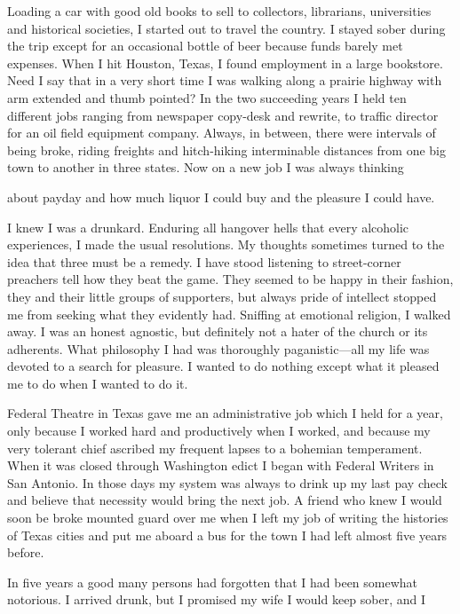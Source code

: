 \begin{biblechapter}
Loading a car with good old books to sell to collectors, librarians, universities and historical societies, I started out to travel the country. I stayed sober during the trip except for an occasional bottle of beer because funds barely met expenses. When I hit Houston, Texas, I found employment in a large bookstore. Need I say that in a very short time I was walking along a prairie highway with arm extended and thumb pointed? In the two succeeding years I held ten different jobs ranging from newspaper copy-desk and rewrite, to traffic director for an oil field equipment company. Always, in between, there were intervals of being broke, riding freights and hitch-hiking interminable distances from one big town to another in three states. Now on a new job I was always thinking

about payday and how much liquor I could buy and the pleasure I could have.

I knew I was a drunkard. Enduring all hangover hells that every alcoholic experiences, I made the usual resolutions. My thoughts sometimes turned to the idea that three must be a remedy. I have stood listening to street-corner preachers tell how they beat the game. They seemed to be happy in their fashion, they and their little groups of supporters, but always pride of intellect stopped me from seeking what they evidently had. Sniffing at emotional religion, I walked away. I was an honest agnostic, but definitely not a hater of the church or its adherents. What philosophy I had was thoroughly paganistic—all my life was devoted to a search for pleasure. I wanted to do nothing except what it pleased me to do when I wanted to do it.

Federal Theatre in Texas gave me an administrative job which I held for a year, only because I worked hard and productively when I worked, and because my very tolerant chief ascribed my frequent lapses to a bohemian temperament. When it was closed through Washington edict I began with Federal Writers in San Antonio. In those days my system was always to drink up my last pay check and believe that necessity would bring the next job. A friend who knew I would soon be broke mounted guard over me when I left my job of writing the histories of Texas cities and put me aboard a bus for the town I had left almost five years before.

In five years a good many persons had forgotten that I had been somewhat notorious. I arrived drunk, but I promised my wife I would keep sober, and I


\end{biblechapter}
